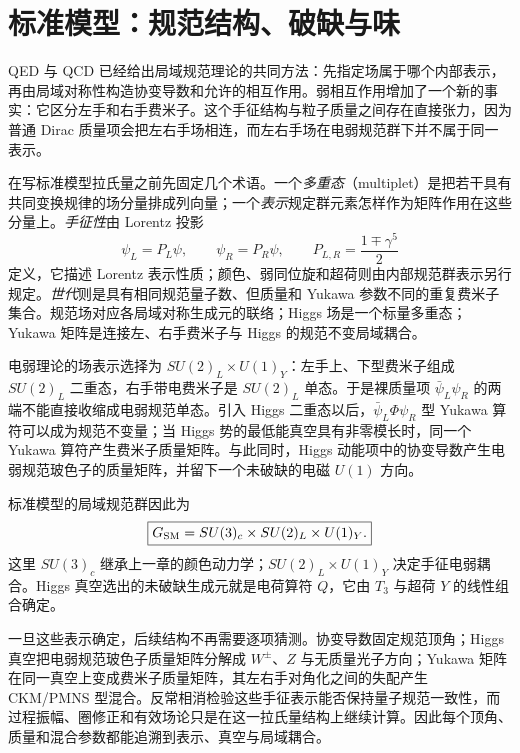 \chapter{标准模型：规范结构、破缺与味}\label{chap:standard-model}

QED 与 QCD 已经给出局域规范理论的共同方法：先指定场属于哪个内部表示，再由局域对称性构造协变导数和允许的相互作用。弱相互作用增加了一个新的事实：它区分左手和右手费米子。这个手征结构与粒子质量之间存在直接张力，因为普通 Dirac 质量项会把左右手场相连，而左右手场在电弱规范群下并不属于同一表示。

在写标准模型拉氏量之前先固定几个术语。一个\emph{多重态}（multiplet）是把若干具有共同变换规律的场分量排成列向量；一个\emph{表示}规定群元素怎样作为矩阵作用在这些分量上。\emph{手征性}由 Lorentz 投影
\begin{equation*}
 \psi_L=P_L\psi,\qquad \psi_R=P_R\psi,
 \qquad P_{L,R}=\frac{1\mp\gamma^5}{2}
\end{equation*}
定义，它描述 Lorentz 表示性质；颜色、弱同位旋和超荷则由内部规范群表示另行规定。\emph{世代}则是具有相同规范量子数、但质量和 Yukawa 参数不同的重复费米子集合。规范场对应各局域对称生成元的联络；Higgs 场是一个标量多重态；Yukawa 矩阵是连接左、右手费米子与 Higgs 的规范不变局域耦合。

电弱理论的场表示选择为 $SU(2)_L\times U(1)_Y$：左手上、下型费米子组成 $SU(2)_L$ 二重态，右手带电费米子是 $SU(2)_L$ 单态。于是裸质量项 $\bar\psi_L\psi_R$ 的两端不能直接收缩成电弱规范单态。引入 Higgs 二重态以后，$\bar\psi_L\Phi\psi_R$ 型 Yukawa 算符可以成为规范不变量；当 Higgs 势的最低能真空具有非零模长时，同一个 Yukawa 算符产生费米子质量矩阵。与此同时，Higgs 动能项中的协变导数产生电弱规范玻色子的质量矩阵，并留下一个未破缺的电磁 $U(1)$ 方向。

标准模型的局域规范群因此为
\begin{equation}
 \boxed{G_{\rm SM}=SU(3)_c\times SU(2)_L\times U(1)_Y.}
 \label{eq:sm-gauge-group-dp11}
\end{equation}
这里 $SU(3)_c$ 继承上一章的颜色动力学；$SU(2)_L\times U(1)_Y$ 决定手征电弱耦合。Higgs 真空选出的未破缺生成元就是电荷算符 $Q$，它由 $T_3$ 与超荷 $Y$ 的线性组合确定。

一旦这些表示确定，后续结构不再需要逐项猜测。协变导数固定规范顶角；Higgs 真空把电弱规范玻色子质量矩阵分解成 $W^\pm$、$Z$ 与无质量光子方向；Yukawa 矩阵在同一真空上变成费米子质量矩阵，其左右手对角化之间的失配产生 CKM/PMNS 型混合。反常相消检验这些手征表示能否保持量子规范一致性，而过程振幅、圈修正和有效场论只是在这一拉氏量结构上继续计算。因此每个顶角、质量和混合参数都能追溯到表示、真空与局域耦合。







